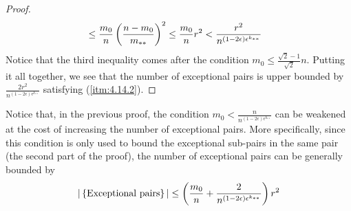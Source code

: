 \begin{lemma}[Claim 4.14]
\begin{proof}
\[\begin{split}
                        & \leq \frac{m_0}{n} \left( \frac{n - m_0}{m_{**}} \right)^2
                            \leq \frac{m_0}{n} r^2
                            < \frac{r^2}{n^{(1-2\epsilon) \epsilon^{k_{**}}}}
                \end{split}
            \]
            Notice that the third inequality comes after the condition $m_0 \leq \frac{\sqrt{2}-1}{\sqrt{2}} n$.
            Putting it all together, we see that the number of exceptional pairs is upper bounded by
                $\frac{2r^2}{n^{(1-2\epsilon)\epsilon^{k_{**}}}}$ satisfying (\ref{itm:4.14.2}).
        \end{proof}
    \end{lemma}

    \begin{remark}[Remark 4.15]
        Notice that, in the previous proof, the condition $m_0 < \frac{n}{n^{(1-2\epsilon)\epsilon^{k_{**}}}}$ can be
        weakened at the cost of increasing the number of exceptional pairs.
        More specifically, since this condition is only used to bound the exceptional sub-pairs in the same pair
        (the second part of the proof), the number of exceptional pairs can be generally bounded by
        \[
            |\left\{ \text{Exceptional pairs} \right\}|
                \leq \left( \frac{m_0}{n} + \frac{2}{n^{(1-2\epsilon)\epsilon^{k_{**}}}} \right) r^2
        \]
    \end{remark}


